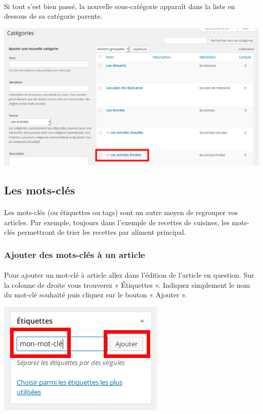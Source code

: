 \documentclass[10pt,a4paper]{article}
\begin{document}
\paragraph{}Si tout s'est bien passé, la nouvelle sous-catégorie apparaît dans la liste en dessous de sa catégorie parente.
\begin{center}
\includegraphics[scale=0.3]{img/0094.png}
\end{center}
\subsection{Les mots-clés}
\paragraph{}Les mots-clés (ou étiquettes ou tags) sont un autre moyen de regrouper vos articles. Par exemple, toujours dans l'exemple de recettes de cuisines, les mots-clés permettront de trier les recettes par aliment principal.
\subsubsection{Ajouter des mots-clés à un article}
\paragraph{}Pour ajouter un mot-clé à article allez dans l'édition de l'article en question. Sur la colonne de droite vous trouverez « Étiquettes ». Indiquez simplement le nom du mot-clé souhaité puis cliquez sur le bouton « Ajouter ».
\begin{center}
\includegraphics[scale=0.3]{img/0095.png}
\end{center}
\end{document}
